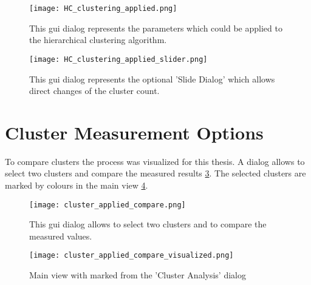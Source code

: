 \begin{figure}[ht]
    \centering
    \texttt{[image: HC\_clustering\_applied.png]}
    \caption{This gui dialog represents the parameters which could be applied to the hierarchical clustering algorithm.}
    \label{fig:applied_HC_clustering_GUI}
\end{figure}

\begin{figure}[ht]
    \centering
    \texttt{[image: HC\_clustering\_applied\_slider.png]}
    \caption{This gui dialog represents the optional 'Slide Dialog' which allows direct changes of the cluster count.}
    \label{fig:applied_HC_clustering_slider_GUI}
\end{figure}

\pagebreak
\section{Cluster Measurement Options}
To compare clusters the process was visualized for this thesis. A dialog allows to select two clusters and compare the measured results \ref{fig:applied_clustering_analysis_GUI}. The selected clusters are marked by colours in the main view \ref{fig:applied_clustering_analysis_visualized_GUI}.

\begin{figure}[ht]
    \centering
    \texttt{[image: cluster\_applied\_compare.png]}
    \caption{This gui dialog allows to select two clusters and to compare the measured values.}
    \label{fig:applied_clustering_analysis_GUI}
\end{figure}

\begin{figure}[ht]
    \centering
    \begin{mdframed}[style=border]
        \texttt{[image: cluster\_applied\_compare\_visualized.png]}
    \end{mdframed}
    \caption{Main view with marked from the 'Cluster Analysis' dialog}
    \label{fig:applied_clustering_analysis_visualized_GUI}
\end{figure}


